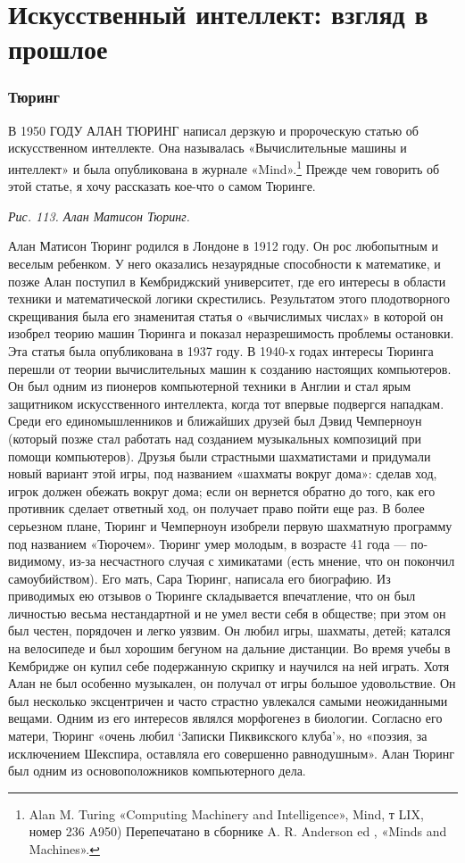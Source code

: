 \documentclass[../main.tex]{subfiles}
\begin{document}
\chapter{Искусственный интеллект: взгляд в прошлое}

\subsection{Тюринг}

В 1950 ГОДУ АЛАН ТЮРИНГ написал дерзкую и пророческую статью об искусственном интеллекте. Она называлась «Вычислительные машины и интеллект» и была опубликована в журнале «Mind».\footnote{Alan M. Turing «Computing Machinery and Intelligence», Mind, т LIX, номер 236 A950) Перепечатано в сборнике A. R. Anderson ed , «Minds and Machines».} Прежде чем говорить об этой статье, я хочу рассказать кое-что о самом Тюринге.

\emph{Рис. 113. Алан Матисон Тюринг.}

Алан Матисон Тюринг родился в Лондоне в 1912 году. Он рос любопытным и веселым ребенком. У него оказались незаурядные способности к математике, и позже Алан поступил в Кембриджский университет, где его интересы в области техники и математической логики скрестились. Результатом этого плодотворного скрещивания была его знаменитая статья о «вычислимых числах» в которой он изобрел теорию машин Тюринга и показал неразрешимость проблемы остановки. Эта статья была опубликована в 1937 году. В 1940-х годах интересы Тюринга перешли от теории вычислительных машин к созданию настоящих компьютеров. Он был одним из пионеров компьютерной техники в Англии и стал ярым защитником искусственного интеллекта, когда тот впервые подвергся нападкам. Среди его единомышленников и ближайших друзей был Дэвид Чемперноун (который позже стал работать над созданием музыкальных композиций при помощи компьютеров). Друзья были страстными шахматистами и придумали новый вариант этой игры, под названием «шахматы вокруг дома»: сделав ход, игрок должен обежать вокруг дома; если он вернется обратно до того, как его противник сделает ответный ход, он получает право пойти еще раз. В более серьезном плане, Тюринг и Чемперноун изобрели первую шахматную программу под названием «Тюрочем». Тюринг умер молодым, в возрасте 41 года --- по-видимому, из-за несчастного случая с химикатами (есть мнение, что он покончил самоубийством). Его мать, Сара Тюринг, написала его биографию. Из приводимых ею отзывов о Тюринге складывается впечатление, что он был личностью весьма нестандартной и не умел вести себя в обществе; при этом он был честен, порядочен и легко уязвим. Он любил игры, шахматы, детей; катался на велосипеде и был хорошим бегуном на дальние дистанции. Во время учебы в Кембридже он купил себе подержанную скрипку и научился на ней играть. Хотя Алан не был особенно музыкален, он получал от игры большое удовольствие. Он был несколько эксцентричен и часто страстно увлекался самыми неожиданными вещами. Одним из его интересов являлся морфогенез в биологии. Согласно его матери, Тюринг «очень любил \enquote*{Записки Пиквикского клуба}», но «поэзия, за исключением Шекспира, оставляла его совершенно равнодушным». Алан Тюринг был одним из основоположников компьютерного дела.
\end{document}

